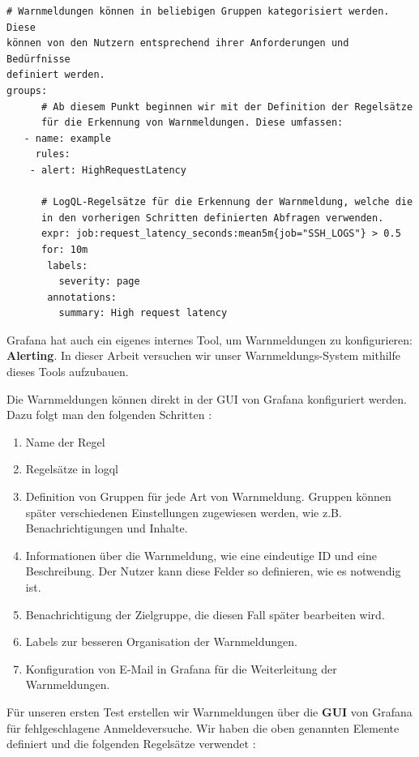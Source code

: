 {
\begin{Verbatim}[frame=single]
# Warnmeldungen können in beliebigen Gruppen kategorisiert werden. Diese
können von den Nutzern entsprechend ihrer Anforderungen und Bedürfnisse
definiert werden.
groups:
      # Ab diesem Punkt beginnen wir mit der Definition der Regelsätze
      für die Erkennung von Warnmeldungen. Diese umfassen:
   - name: example
     rules:
    - alert: HighRequestLatency

      # LogQL-Regelsätze für die Erkennung der Warnmeldung, welche die
      in den vorherigen Schritten definierten Abfragen verwenden.
      expr: job:request_latency_seconds:mean5m{job="SSH_LOGS"} > 0.5
      for: 10m
       labels:
         severity: page
       annotations:
         summary: High request latency
\end{Verbatim}
}

\newpage
Grafana hat auch ein eigenes internes Tool, um Warnmeldungen zu konfigurieren: \textbf{Alerting}. In dieser Arbeit versuchen wir unser Warnmeldungs-System mithilfe dieses Tools aufzubauen.

Die Warnmeldungen können direkt in der \gls{GUI} von Grafana konfiguriert werden. Dazu folgt man den folgenden Schritten \citep{Grafana_alerting}:

{
\begin{enumerate}[noitemsep]
   \item Name der Regel
   \item Regelsätze in \gls{logql}
   \item Definition von Gruppen für jede Art von Warnmeldung. Gruppen können später verschiedenen Einstellungen zugewiesen werden, wie z.B. Benachrichtigungen und Inhalte.
   \item Informationen über die Warnmeldung, wie eine eindeutige ID und eine Beschreibung. Der Nutzer kann diese Felder so definieren, wie es notwendig ist.
   \item Benachrichtigung der Zielgruppe, die diesen Fall später bearbeiten wird.
   \item Labels zur besseren Organisation der Warnmeldungen.
   \item Konfiguration von E-Mail in Grafana für die Weiterleitung der Warnmeldungen.
\end{enumerate}
}

Für unseren ersten Test erstellen wir Warnmeldungen über die \textbf{\gls{GUI}} von Grafana für fehlgeschlagene Anmeldeversuche. Wir haben die oben genannten Elemente definiert und die folgenden Regelsätze verwendet \citep{VoidQuark_sshlogs}:

